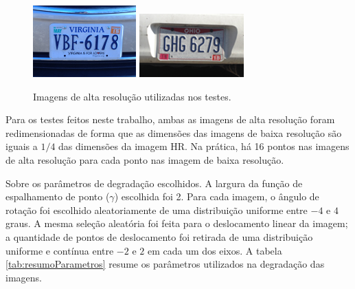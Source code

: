 \begin{figure}[h]
	\centering
	\caption{\label{fig:hrimage}Imagens de alta resolução utilizadas nos testes.}
	\includegraphics{figures/imtestes.png}
	\includegraphics{figures/imteste2s.png}

\end{figure}

Para os testes feitos neste trabalho, ambas as imagens de alta resolução foram
redimensionadas de forma que as dimensões das imagens de baixa resolução são iguais a
$1/4$ das dimensões da imagem HR.  
Na prática, há 16 pontos nas imagens de alta resolução para cada ponto nas imagem de
baixa resolução.

Sobre os parâmetros de degradação escolhidos. A largura da função de espalhamento de ponto ($\gamma$) escolhida foi 2.
Para cada imagem, o ângulo de rotação foi escolhido aleatoriamente de uma distribuição uniforme entre $-4$ e $4$ graus.
A mesma seleção aleatória foi feita para o deslocamento linear da imagem; a quantidade de pontos de deslocamento foi retirada de uma distribuição uniforme e contínua entre $-2$ e $2$ em cada um dos eixos.
A tabela \ref{tab:resumoParametros} resume os parâmetros utilizados na degradação das imagens.

